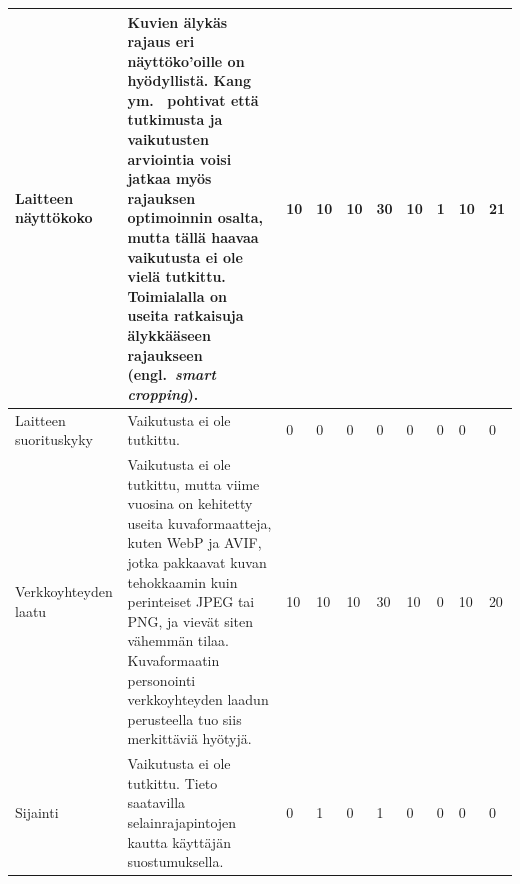 \documentclass[finnish, 12pt, a4paper, elec, utf8, a-1b, online]{aaltothesis}
\begin{document}
{\begin{longtable}{p{2.5cm}|p{6cm}|p{0.5cm}p{0.5cm}p{0.5cm}|p{0.5cm}|p{0.5cm}p{0.5cm}p{0.5cm}|p{0.5cm}|}
        \midrule
        Laitteen näyttökoko                    & Kuvien älykäs rajaus eri näyttöko'oille on hyödyllistä. Kang ym.~\cite{5539850} pohtivat että tutkimusta ja vaikutusten arviointia voisi jatkaa myös rajauksen optimoinnin osalta, mutta tällä haavaa vaikutusta ei ole vielä tutkittu. Toimialalla on useita ratkaisuja älykkääseen rajaukseen (engl.~\textit{smart cropping}).                                          & 10                                         & 10                                  & 10                                     & 30                           & 10                                              & 1                                         & 10                                        & 21                           \\
        \midrule
        Laitteen suorituskyky                  & Vaikutusta ei ole tutkittu.                                                                                                                                                                                                                                                                                                                                               & 0                                          & 0                                   & 0                                      & 0                            & 0                                               & 0                                         & 0                                         & 0                            \\
        \midrule
        Verkkoyhteyden laatu                   & Vaikutusta ei ole tutkittu, mutta viime vuosina on kehitetty useita kuvaformaatteja, kuten WebP ja AVIF, jotka pakkaavat kuvan tehokkaamin kuin perinteiset JPEG tai PNG, ja vievät siten vähemmän tilaa. Kuvaformaatin personointi verkkoyhteyden laadun perusteella tuo siis merkittäviä hyötyjä.                                                                       & 10                                         & 10                                  & 10                                     & 30                           & 10                                              & 0                                         & 10                                        & 20                           \\
        \midrule
        Sijainti                               & Vaikutusta ei ole tutkittu. Tieto saatavilla selainrajapintojen kautta käyttäjän suostumuksella.                                                                                                                                                                                                                                                                          & 0                                          & 1                                   & 0                                      & 1                            & 0                                               & 0                                         & 0                                         & 0                            \\

\end{longtable}}
\end{document}
